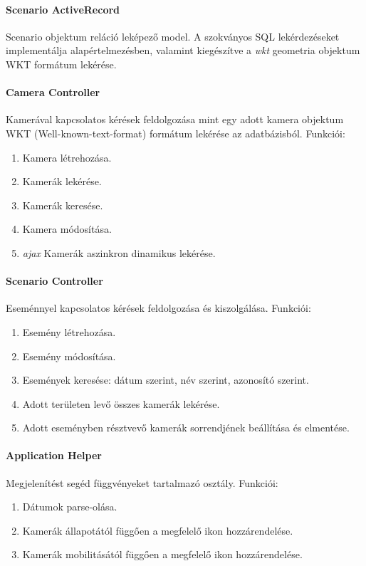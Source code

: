 	\paragraph{Scenario ActiveRecord}
  Scenario objektum reláció leképező model. A szokványos SQL lekérdezéseket implementálja alapértelmezésben, valamint kiegészítve a \emph{wkt} geometria objektum WKT formátum lekérése.
	
	\paragraph{Camera Controller}
	Kamerával kapcsolatos kérések feldolgozása mint egy adott kamera objektum WKT (Well-known-text-format) formátum lekérése az adatbázisból.
	Funkciói:
	\begin{enumerate}
	 \item Kamera létrehozása.
	 \item Kamerák lekérése.
	 \item Kamerák keresése.
	 \item Kamera módosítása.
	 \item \emph{ajax} Kamerák aszinkron dinamikus lekérése.
	\end{enumerate}
	
	\paragraph{Scenario Controller}
	Eseménnyel kapcsolatos kérések feldolgozása és kiszolgálása.
	Funkciói:
	\begin{enumerate}
	 \item Esemény létrehozása.
	 \item Esemény módosítása.
	 \item Események keresése: dátum szerint, név szerint, azonosító szerint.
	 \item Adott területen levő összes kamerák lekérése.
	 \item Adott eseményben résztvevő kamerák sorrendjének beállítása és elmentése.
	\end{enumerate}
	
	\paragraph{Application Helper}
  Megjelenítést segéd függvényeket tartalmazó osztály.
  Funkciói:
  \begin{enumerate}
    \item Dátumok parse-olása.
	  \item Kamerák állapotától függően a megfelelő ikon hozzárendelése.
	  \item Kamerák mobilitásától függően a megfelelő ikon hozzárendelése.
  \end{enumerate}
	
